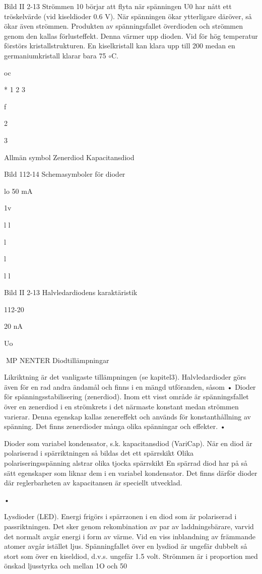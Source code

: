 {Bild II 2-13
Strömmen 10 börjar att flyta när spänningen U0 har nått ett tröskelvärde (vid kiseldioder 0.6 V). När spänningen ökar ytterligare däröver, så ökar även strömmen.
Produkten av spänningsfallet överdioden
och strömmen genom den kallas förlusteffekt. Denna värmer upp dioden. Vid för hög
temperatur förstörs kristallstrukturen. En kiselkristall kan klara upp till 200
medan en
germaniumkristall klarar bara 75 \(\circ\)C.

oc

*
1
2
3

f

2

3

Allmän symbol
Zenerdiod
Kapacitansdiod

Bild 112-14 Schemasymboler för dioder

lo
50 mA

1v

l
l

l

l

l
l

Bild II 2-13 Halvledardiodens karaktäristik

112-20

20 nA

Uo

MP NENTER
Diodtillämpningar

Likriktning är det vanligaste tillämpningen
(se kapitel3). Halvledardioder görs även för
en rad andra ändamål och finns i en mängd
utföranden, såsom
• Dioder för spänningsstabilisering (zenerdiod).
Inom ett visst område är spänningsfallet
över en zenerdiod i en strömkrets i det
närmaste konstant medan strömmen varierar. Denna egenskap kallas zenereffekt
och används för konstanthållning av spänning.
Det finns zenerdioder
många olika
spänningar och effekter.
•

Dioder som variabel kondensator, s.k.
kapacitansdiod (VariCap).
När en diod är polariserad i spärriktningen så bildas det ett spärrskikt Olika polariseringsspänning alstrar olika tjocka
spärrskikt En spärrad diod har på så sätt
egenskaper som liknar dem i en variabel
kondensator. Det finns därför dioder där
reglerbarheten av kapacitansen är speciellt utvecklad.

•

Lysdioder (LED).
Energi frigörs i spärrzonen i en diod som
är polariserad i passriktningen. Det sker
genom rekombination av par av laddningsbärare, varvid det normalt avgår
energi i form av värme.
Vid en viss inblandning av främmande
atomer avgår istället ljus. Spänningfallet
över en lysdiod är ungefär dubbelt så
stort som över en kiseldiod, d.v.s. ungefär 1.5 volt. Strömmen är i proportion med
önskad ljusstyrka och mellan 1O och 50

}
